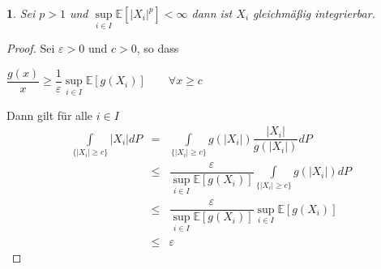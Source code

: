\documentclass[10pt,a4paper]{report}
\newcommand{\E}{\mathbb{E}}
\numberwithin{equation}{section}
\numberwithin{figure}{section}
\theoremstyle{plain}
\theoremstyle{definition}
\theoremstyle{remark}
\theoremstyle{plain}
\newtheorem{cor}[thm]{\protect\corollaryname}
\providecommand{\corollaryname}{Korollar}
\newcommand{\1}{ \mathbb{1} } %
\begin{document}
\begin{cor}
  Sei $p>1$ und $\sup\limits_{i \in I}\E[|X_i|^p]<\infty$ dann ist
  $X_i$ gleichmäßig integrierbar.
\end{cor}
\begin{proof}
  Sei $\varepsilon > 0$ und $c>0$, so dass
  \begin{center}
    $\dfrac{g(x)}{x}\geq \dfrac{1}{\varepsilon} \sup\limits_{i \in
      I}\E[g(X_i)] \qquad \forall x \geq c$
  \end{center}
  Dann gilt für alle $i \in I$
  \begin{eqnarray*}
    \int\limits_{\{|X_i|\geq c\}} |X_i|dP &=& \int\limits_{\{|X_i|\geq c\}} g(|X_i|)\dfrac{|X_i|}{g(|X_i|)} dP\\
    &\leq &\dfrac{\varepsilon}{\sup\limits_{i \in I}\E[g(X_i)]}\int\limits_{\{|X_i|\geq c\}} g(|X_i|)dP\\
    &\leq & \dfrac{\varepsilon}{\sup\limits_{i \in I}\E[g(X_i)]}\sup\limits_{i \in I}\E[g(X_i)]\\
    &\leq & \varepsilon 
  \end{eqnarray*}
\end{proof}
\end{document}
